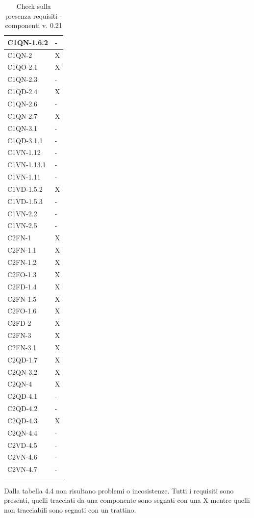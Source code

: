 \begin{footnotesize}
\begin{longtable}{|p{}|p{}|}
 C1QN-1.6.2&-   \\ \hline
 C1QN-2&X \\ \hline
 C1QO-2.1&X \\ \hline
 C1QN-2.3&-  \\ \hline
 C1QD-2.4&X  \\ \hline
 C1QN-2.6&-  \\ \hline
 C1QN-2.7&X    \\ \hline
 C1QN-3.1&-   \\ \hline
 C1QD-3.1.1&-    \\ \hline
 C1VN-1.12&- \\ \hline
 C1VN-1.13.1&-  \\ \hline
 C1VN-1.11&-  \\ \hline
 C1VD-1.5.2&X \\ \hline
 C1VD-1.5.3&-   \\ \hline
 C1VN-2.2&- \\ \hline
 C1VN-2.5&-  \\ \hline
 C2FN-1&X    \\ \hline
 C2FN-1.1&X    \\ \hline
 C2FN-1.2&X   \\ \hline
 C2FO-1.3&X    \\ \hline
 C2FD-1.4&X   \\ \hline
 C2FN-1.5&X   \\ \hline
 C2FO-1.6&X   \\ \hline
 C2FD-2&X    \\ \hline
 C2FN-3&X   \\ \hline
 C2FN-3.1&X   \\ \hline
 C2QD-1.7&X   \\ \hline
 C2QN-3.2&X   \\ \hline
 C2QN-4 &X  \\ \hline
 C2QD-4.1&-    \\ \hline
 C2QD-4.2&-   \\ \hline
 C2QD-4.3&X   \\ \hline
 C2QN-4.4&-  \\ \hline
 C2VD-4.5&-   \\ \hline
 C2VN-4.6&-    \\ \hline
 C2VN-4.7&-  \\ \hline

\caption{Check sulla presenza requisiti - componenti v. 0.21}
\end{longtable}
\end{footnotesize}

Dalla tabella 4.4 non risultano problemi o incosistenze. Tutti i requisiti sono
presenti, quelli tracciati da una componente sono segnati con una X mentre
quelli non tracciabili sono segnati con un trattino.

